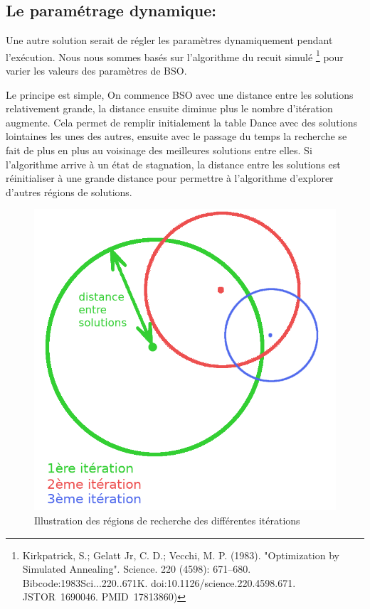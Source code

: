 	\subsection{Le paramétrage dynamique:}
	Une autre solution serait de régler les paramètres dynamiquement pendant l’exécution. Nous nous sommes basés sur l’algorithme du recuit simulé \footnote{Kirkpatrick, S.; Gelatt Jr, C. D.; Vecchi, M. P. (1983). "Optimization by Simulated Annealing". Science. 220 (4598): 671–680. Bibcode:1983Sci...220..671K. doi:10.1126/science.220.4598.671. JSTOR 1690046. PMID 17813860)
	} pour varier les valeurs des paramètres de BSO.

	Le principe est simple, On commence BSO avec une distance entre les solutions relativement grande, la distance ensuite diminue plus le nombre d’itération augmente. Cela permet de remplir initialement la table Dance avec des solutions lointaines les unes des autres, ensuite avec le passage du temps la recherche se fait de plus en plus au voisinage des meilleures solutions entre elles. Si l’algorithme arrive à un état de stagnation, la distance entre les solutions est réinitialiser à une grande distance pour permettre à l’algorithme d’explorer d’autres régions de solutions.
	\begin{figure}[H]\label{Regions}
		\centering
		\includegraphics[scale=0.35]{images/imgs/regions.png}
		\caption{Illustration des régions de recherche des différentes itérations}
	\end{figure}
